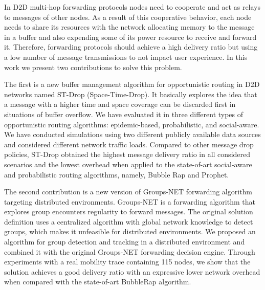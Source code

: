 In D2D multi-hop forwarding protocols nodes need to cooperate and act as relays to messages of other nodes. As a result of this cooperative behavior,
each node needs to share its resources with the network allocating memory to the message in a buffer and also expending some of its power resource to receive and forward it. Therefore, forwarding protocols should achieve a high delivery ratio but using a low number of message transmissions to not impact user experience. In this work we present two contributions to solve this problem.

The first is a new buffer management algorithm for opportunistic routing in D2D networks named ST-Drop (Space-Time-Drop). It basically explores the idea that a message with a higher time and space coverage can be discarded first in situations of buffer overflow. We have evaluated it in three different types of opportunistic routing algorithms: epidemic-based, probabilistic, and social-aware. We have conducted simulations using two different publicly available data sources and considered different network traffic loads. Compared to other message drop policies, ST-Drop obtained the highest message delivery ratio in all considered scenarios and the lowest overhead when applied to the state-of-art social-aware and probabilistic routing algorithms, namely, Bubble Rap and Prophet.

The second contribution is a new version of Groups-NET forwarding algorithm targeting distributed environments. Groups-NET is a forwarding algorithm that explores group encounters regularity to forward messages. The original solution definition uses a centralized algorithm with global network knowledge to detect groups, which makes it unfeasible for distributed environments. We proposed an algorithm for group detection and tracking in a distributed environment and combined it with the original Groups-NET forwarding decision engine. Through experiments with a real mobility trace containing 115 nodes, we show that the solution achieves a good delivery ratio with an expressive lower network overhead when compared with the state-of-art BubbleRap algorithm.